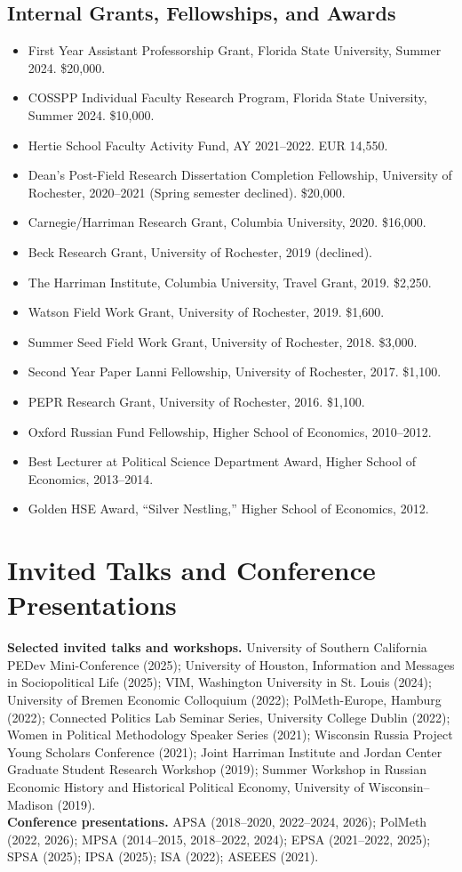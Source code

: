 \documentclass[10pt]{article}
\begin{document}
\subsection{Internal Grants, Fellowships, and Awards}
\begin{itemize}
    \item First Year Assistant Professorship Grant, Florida State University, Summer 2024. \$20,000.
    \item COSSPP Individual Faculty Research Program, Florida State University, Summer 2024. \$10,000.
    \item Hertie School Faculty Activity Fund, AY 2021--2022. EUR 14,550.
    \item Dean's Post-Field Research Dissertation Completion Fellowship, University of Rochester, 2020--2021 (Spring semester declined). \$20,000.
    \item Carnegie/Harriman Research Grant, Columbia University, 2020. \$16,000.
    \item Beck Research Grant, University of Rochester, 2019 (declined).
    \item The Harriman Institute, Columbia University, Travel Grant, 2019. \$2,250.
    \item Watson Field Work Grant, University of Rochester, 2019. \$1,600.
    \item Summer Seed Field Work Grant, University of Rochester, 2018. \$3,000.
    \item Second Year Paper Lanni Fellowship, University of Rochester, 2017. \$1,100.
    \item PEPR Research Grant, University of Rochester, 2016. \$1,100.
    \item Oxford Russian Fund Fellowship, Higher School of Economics, 2010--2012.
    \item Best Lecturer at Political Science Department Award, Higher School of Economics, 2013--2014.
    \item Golden HSE Award, ``Silver Nestling,'' Higher School of Economics, 2012.
\end{itemize}

\section{Invited Talks and Conference Presentations}
\textbf{Selected invited talks and workshops.} University of Southern California PEDev Mini-Conference (2025); University of Houston, Information and Messages in Sociopolitical Life (2025); VIM, Washington University in St. Louis (2024); University of Bremen Economic Colloquium (2022); PolMeth-Europe, Hamburg (2022); Connected Politics Lab Seminar Series, University College Dublin (2022); Women in Political Methodology Speaker Series (2021); Wisconsin Russia Project Young Scholars Conference (2021); Joint Harriman Institute and Jordan Center Graduate Student Research Workshop (2019); Summer Workshop in Russian Economic History and Historical Political Economy, University of Wisconsin--Madison (2019).\\[3pt]
\textbf{Conference presentations.} APSA (2018--2020, 2022--2024, 2026); PolMeth (2022, 2026); MPSA (2014--2015, 2018--2022, 2024); EPSA (2021--2022, 2025); SPSA (2025); IPSA (2025); ISA (2022); ASEEES (2021).
\end{document}
